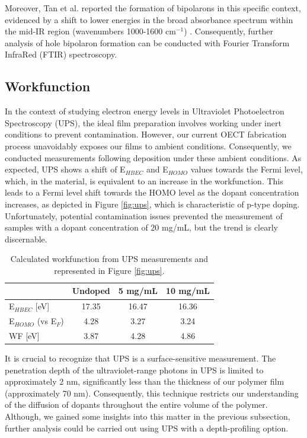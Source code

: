 Moreover, Tan et al. reported the formation of bipolarons in this specific context, evidenced by a shift to lower energies in the broad absorbance spectrum within the mid-IR region (wavenumbers 1000-1600 cm$^{-1}$) \cite{tanTuningOrganicElectrochemical2022}. Consequently, further analysis of hole bipolaron formation can be conducted with Fourier Transform InfraRed (FTIR) spectroscopy.
 
\subsection{Workfunction}

In the context of studying electron energy levels in Ultraviolet Photoelectron Spectroscopy (UPS), the ideal film preparation involves working under inert conditions to prevent contamination. However, our current OECT fabrication process unavoidably exposes our films to ambient conditions. Consequently, we conducted measurements following deposition under these ambient conditions. As expected, UPS shows a shift of E$_{HBEC}$ and E$_{HOMO}$ values towards the Fermi level, which, in the material, is equivalent to an increase in the workfunction. This leads to a Fermi level shift towards the HOMO level as the dopant concentration increases, as depicted in Figure \ref{fig:ups}, which is characteristic of p-type doping. Unfortunately, potential contamination issues prevented the measurement of samples with a dopant concentration of 20 mg/mL, but the trend is clearly discernable.

\begin{table}[ht]
\centering
\caption{Calculated workfunction from UPS measurements and represented in Figure \ref{fig:ups}.}
\begin{tabular}{l|c|c|c}
& Undoped & 5 mg/mL & 10 mg/mL \\\hline
E$_{HBEC}$ [eV] & 17.35 & 16.47 & 16.36\\
E$_{HOMO}$ (vs E$_{F}$) & 4.28 & 3.27 & 3.24\\
WF [eV] & 3.87 & 4.28 & 4.86\\\hline
\end{tabular}
\label{tab:ups}
\end{table}

It is crucial to recognize that UPS is a surface-sensitive measurement. The penetration depth of the ultraviolet-range photons in UPS is limited to approximately 2 nm, significantly less than the thickness of our polymer film (approximately 70 nm). Consequently, this technique restricts our understanding of the diffusion of dopants throughout the entire volume of the polymer. Although, we gained some insights into this matter in the previous subsection, further analysis could be carried out using UPS with a depth-profiling option. 


